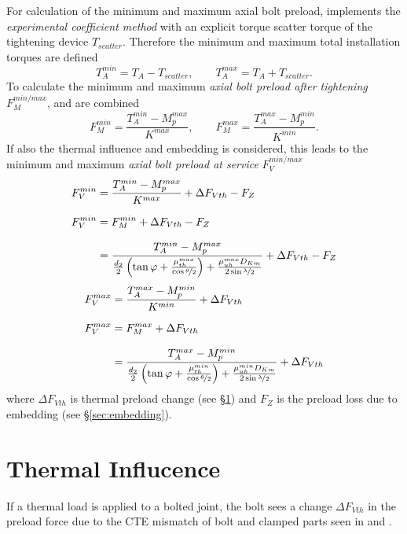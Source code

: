 For calculation of the minimum and maximum axial bolt preload, \bat implements the \emph{experimental coefficient method}
\cite{ECSS_HB_32_23A} with an explicit torque scatter torque of the tightening device $T_{scatter}$. Therefore
the minimum and maximum total installation torques are defined 
\begin{equation}
  T_A^{min} = T_A - T_{scatter} , \qquad T_A^{max} = T_A + T_{scatter}.
  \label{equ:Tscatter}
\end{equation}
To calculate the minimum and maximum \emph{axial bolt preload after tightening} $F_M^{min/max}$, 
 and  are combined 
\begin{equation}
  F_M^{min} = \frac{T_A^{min}-M_p^{max}}{K^{max}} ,\qquad
  F_M^{max} = \frac{T_A^{max}-M_p^{min}}{K^{min}}.
\end{equation}
If also the thermal influence and embedding is considered, this leads to the minimum and maximum
\emph{axial bolt preload at service} $F_V^{min/max}$
\begin{subequations}
  \setlength{\jot}{10pt}
  \begin{align}
    F_V^{min} &= \frac{T_A^{min}-M_p^{max}}{K^{max}}+\Delta F_{Vth}-F_Z \\
    F_V^{min} &= F_M^{min}+\Delta F_{Vth}-F_Z \\
    &= \frac{T_A^{min}-M_p^{max}}{\frac{d_2}{2} \left( \tan\varphi + \frac{\mu_{th}^{max}}
    {\cos\nicefrac{\theta}{2}} \right) + \frac{\mu_{uh}^{max} D_{Km}}
    {2 \sin\nicefrac{\lambda}{2}}}+\Delta F_{Vth}-F_Z
    \label{equ:FVmin}
  \end{align}
\end{subequations}
\begin{subequations}
  \setlength{\jot}{10pt}
  \begin{align}
    F_V^{max} &= \frac{T_A^{max}-M_p^{min}}{K^{min}}+\Delta F_{Vth} \\
    F_V^{max} &= F_M^{max}+\Delta F_{Vth} \\
    &= \frac{T_A^{max}-M_p^{min}}{\frac{d_2}{2} \left( \tan\varphi + \frac{\mu_{th}^{min}}
    {\cos \nicefrac{\theta}{2}} \right) + \frac{\mu_{uh}^{min} D_{Km}}
    {2 \sin \nicefrac{\lambda}{2}}}+\Delta F_{Vth}
    \label{equ:FVmax}
  \end{align}
\end{subequations}
where $\Delta F_{Vth}$ is thermal preload change (see §\ref{sec:thermal}) and 
$F_Z$ is the preload loss due to embedding (see §\ref{sec:embedding}).

\section{Thermal Influcence}
\label{sec:thermal}
If a thermal load is applied to a bolted joint, the bolt sees a change $\Delta F_{Vth}$ in the preload
force due to the CTE mismatch of bolt and clamped parts seen in  and .
